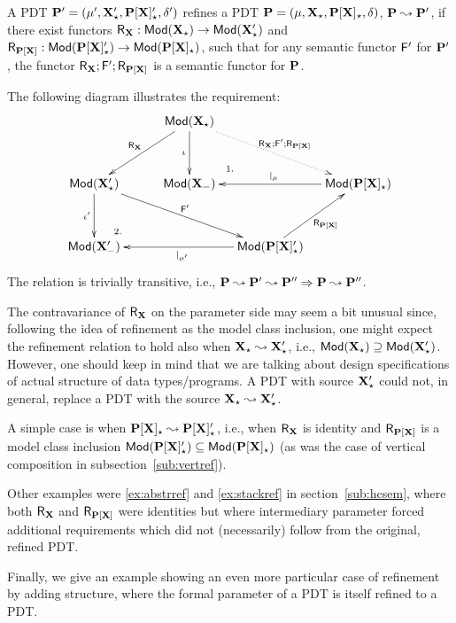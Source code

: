 \begin{definition}\label{def:ref}
A PDT $\thr
P'=\pdtsp{\mu'}{\delta'}{\thr{X'_\cons}}{\thr{P[X]'_\cons}}$
refines a PDT $\thr P=\pdt$, 
$\thr P\leadsto\thr P'$, if there exist functors
$\reff X:\Mod(\thr  X_\cons)\to\Mod(\thr X'_\cons)$ and
$\reff{P[X]}:\Mod(\thr {P[X]'_\cons})\to\Mod(\thr{P[X]_\cons})$, such that
for any semantic functor $\fu F'$ for $\thr P'$, the functor $\reff X;\fu
F';\reff{P[X]}$ is a semantic functor for $\thr P$.
\end{definition}
The following diagram illustrates the requirement:
\[ \xymatrix@R=0.5cm@C=0.4cm{
&& \Mod(\thr{X_\cons})  \ar[dd]_{\iota} \ar@{.>}[rrdd]^{\reff{X};\fu{F}';\reff{P[X]}} \ar[lldd]_{\reff{X}}\\
&& && \\
\Mod(\thr{X'_\cons}) \ar[dd]_{\iota'} \ar[rrrdd]^{\fu{F'}}
	&& \Mod(\thr{X_{\weak}}) \ar@{}[ur]|{1.}
		&& \Mod(\thr{P[X]_\cons}) \ar[ll]_{|_{\mu}} \\
&& && \\
\Mod(\thr{X'_{\weak}}) \ar@{}[ur]|{2.}
	&&& \Mod(\thr{P[X]'_\cons}) \ar[lll]^{|_{\mu'}} \ar[uur]_{\reff{P[X]}}
}
\]
The relation is trivially transitive, i.e., $\thr P\leadsto\thr
P'\leadsto\thr P'' \To \thr P\leadsto \thr P''$.

The contravariance of $\reff{X}$ on the parameter side may seem a bit unusual since,
following the idea of refinement as the model class inclusion, one might
expect the refinement relation to hold also when
$\thr{X_\cons}\leadsto\thr{X'_\cons}$, i.e., $\Mod(\thr
X_\cons)\supseteq\Mod(\thr X'_\cons)$. However, one should keep in mind that
we are talking about design specifications of actual structure of data
types/programs. A PDT with source $\thr{X'_\cons}$ could not, in general,
replace a PDT with the source $\thr{X_\cons}\leadsto\thr{X'_\cons}$. 

A simple case is when $\thr{P[X]_\cons}\leadsto\thr{P[X]'_\cons}$, i.e., when
$\reff{X}$ is identity and
$\reff{P[X]}$ is a model class inclusion $\Mod(\thr{P[X]'_\cons})\subseteq
\Mod(\thr{P[X]_\cons})$ (as was the case of vertical composition in subsection~\ref{sub:vertref}). 

Other examples were \ref{ex:abstrref} and \ref{ex:stackref} in
section~\ref{sub:hcsem}, where both $\reff{X}$ and $\reff{P[X]}$ were
identities but where intermediary parameter forced additional requirements
which did not (necessarily) follow from the original, refined PDT.

Finally, we give an example showing an even more particular case of
refinement by adding structure, where the formal parameter of a PDT is itself
refined to a PDT.

